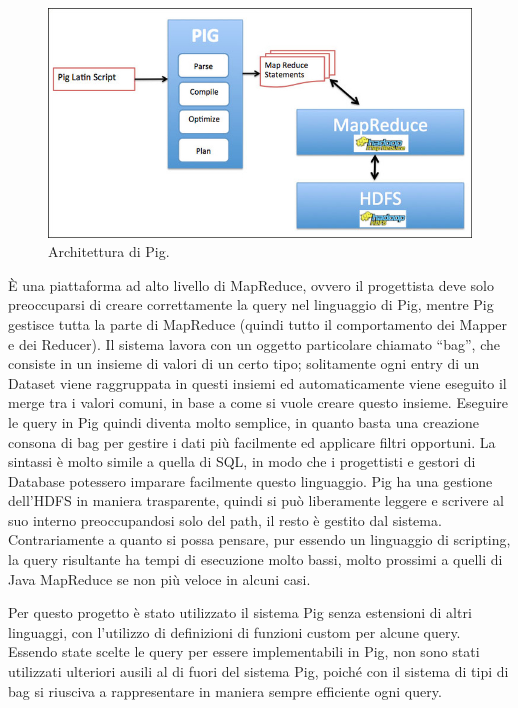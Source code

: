 \documentclass[11pt]{article} %
\begin{document}
\begin{figure}[!ht]
  \caption{Architettura di Pig.}
  \centering
    \includegraphics[scale=0.6]{pig_architecture.jpg}
\end{figure}


 \`E una piattaforma ad alto livello di MapReduce, ovvero il progettista deve solo preoccuparsi di creare correttamente la query nel linguaggio di Pig, mentre Pig gestisce tutta la parte di MapReduce (quindi tutto il comportamento dei Mapper e dei Reducer). Il sistema lavora con un oggetto particolare chiamato ``bag'', che consiste in un insieme di valori di un certo tipo; solitamente ogni entry di un Dataset viene raggruppata in questi insiemi ed automaticamente viene eseguito il merge tra i valori comuni, in base a come si vuole creare questo insieme. Eseguire le query in Pig quindi diventa molto semplice, in quanto basta una creazione consona di bag per gestire i dati più facilmente ed applicare filtri opportuni.  La sintassi è molto simile a quella di SQL, in modo che i progettisti e gestori di Database potessero imparare facilmente questo linguaggio. Pig ha una gestione dell'HDFS in maniera trasparente, quindi si può liberamente leggere e scrivere al suo interno preoccupandosi solo del path, il resto è gestito dal sistema. Contrariamente a quanto si possa pensare, pur essendo un linguaggio di scripting, la query risultante ha tempi di esecuzione molto bassi, molto prossimi a quelli di Java MapReduce se non più veloce in alcuni casi.
 
 Per questo progetto è stato utilizzato il sistema Pig senza estensioni di altri linguaggi, con l'utilizzo di definizioni di funzioni custom per alcune query. Essendo state scelte le query per essere implementabili in Pig, non sono stati utilizzati ulteriori ausili al di fuori del sistema Pig, poiché con il sistema di tipi di bag si riusciva a rappresentare in maniera sempre efficiente ogni query.
\end{document}
